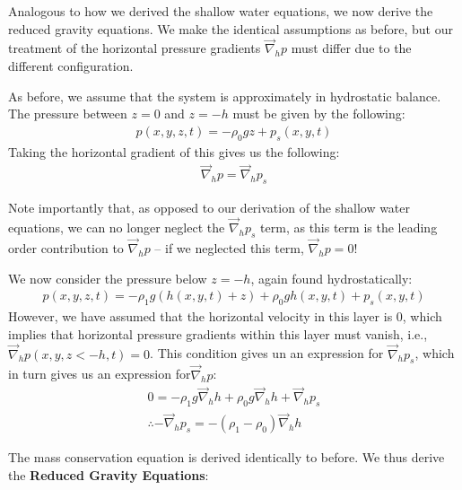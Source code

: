 Analogous to how we derived the shallow water equations, we now derive the reduced gravity equations. We make the identical assumptions as before, but our treatment of the horizontal pressure gradients \(\vec{\nabla}_h p\) must differ due to the different configuration.

As before, we assume that the system is approximately in hydrostatic balance. The pressure between \(z=0\) and \(z=-h\) must be given by the following:
\begin{align*}
    p(x,y,z,t)= -\rho_0 g z + p_s(x,y,t)
\end{align*}
Taking the horizontal gradient of this gives us the following:
\begin{align*}
    \vec{\nabla}_h p = \vec{\nabla}_h p_s
\end{align*}

Note importantly that, as opposed to our derivation of the shallow water equations, we can no longer neglect the \(\vec{\nabla}_h p_s\) term, as this term is the leading order contribution to \(\vec{\nabla}_h p\) – if we neglected this term, \(\vec{\nabla}_h p=0\)!

We now consider the pressure below \(z=-h\), again found hydrostatically:
\begin{align*}
    p(x,y,z,t) = -\rho_1 g ( h(x,y,t) + z) + \rho_0 g h(x,y,t) + p_s(x,y,t)
\end{align*}
However, we have assumed that the horizontal velocity in this layer is \(0\), which implies that horizontal pressure gradients within this layer must vanish, i.e., \(\vec{\nabla}_h p(x,y,z<-h,t)=0\). This condition gives un an expression for \(\vec{\nabla}_h p_s\), which in turn gives us an expression for\( \vec{\nabla}_h p\):
\begin{align*}
    0 = -\rho_1 g \vec{\nabla}_h h + \rho_0 g \vec{\nabla}_h h + \vec{\nabla}_h p_s
    \\
    \therefore - \vec{\nabla}_h p_s = - (\rho_1 - \rho_0)\vec{\nabla}_h h
\end{align*}

The mass conservation equation is derived identically to before. We thus derive the \textbf{Reduced Gravity Equations}:

